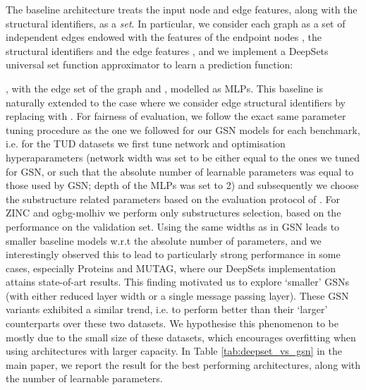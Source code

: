 \documentclass{article} \usepackage{iclr2021_conference,times}
\begin{document}
The baseline architecture treats the input node and edge features, along with the structural identifiers, as a \textit{set}. In particular, we consider each graph as a set of independent edges  endowed with the features of the endpoint nodes , the structural identifiers  and the edge features , and we implement a DeepSets universal set function approximator \citep{zaheer2017deep} to learn a prediction function:
{\small

}
, with  the edge set of the graph and , modelled as MLPs. This baseline is naturally extended to the case where we consider edge structural identifiers by replacing  with . For fairness of evaluation, we follow the exact same parameter tuning procedure as the one we followed for our GSN models for each benchmark, i.e. for the TUD datasets we first tune network and optimisation hyperaparameters (network width was set to be either equal to the ones we tuned for GSN, or such that the absolute number of learnable parameters was equal to those used by GSN; depth of the MLPs was set to 2) and subsequently we choose the substructure related parameters based on the evaluation protocol of \cite{xu2018how}. For ZINC and ogbg-molhiv we perform only substructures selection, based on the performance on the validation set. Using the same widths as in GSN leads to smaller baseline models w.r.t the absolute number of parameters, and we interestingly observed this to lead to particularly strong performance in some cases, especially Proteins and MUTAG, where our DeepSets implementation attains state-of-art results. This finding motivated us to explore `smaller' GSNs (with either reduced layer width or a single message passing layer). These GSN variants exhibited a similar trend, i.e. to perform better than their `larger' counterparts over these two datasets. We hypothesise this phenomenon to be mostly due to the small size of these datasets, which encourages overfitting when using architectures with larger capacity. In Table \ref{tab:deepset_vs_gsn} in the main paper, we report the result for the best performing architectures, along with the number of learnable parameters.
\end{document}
